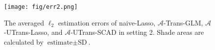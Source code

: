 \documentclass[twoside,12pt]{article}
\begin{document}
\begin{figure}[h]
	\centering
	\texttt{[image: fig/err2.png]}
	\caption{The averaged $\ell_2$ estimation errors of naive-Lasso, $\mathcal A$-Trans-GLM, $\mathcal A$-UTrans-Lasso, and $\mathcal A$-UTrans-SCAD in setting 2. Shade areas are calculated by $\text{estimate}\pm \text{SD}$.}
	\label{fig: err2}
\end{figure}

\newpage
{}
\end{document}
